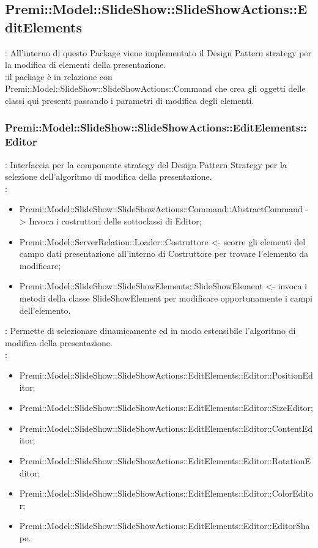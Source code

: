    \subsection{Premi::Model::SlideShow::SlideShowActions::EditElements}{
		\textbf{\tipo}: All’interno di questo Package viene implementato il Design Pattern strategy per la modifica di elementi della presentazione.\\
		\textbf{\relaz}:il package è in relazione con Premi::Model::SlideShow::SlideShowActions::Command che crea gli oggetti delle classi qui presenti passando i parametri di modifica degli elementi.\\
	
	\subsubsection{Premi::Model::SlideShow::SlideShowActions::EditElements::Editor}{
		\textbf{\tipo}: Interfaccia per la componente strategy del Design Pattern Strategy per la selezione dell'algoritmo di modifica della presentazione.\\	
		\textbf{\relaz}:
		\begin{itemize}
			\item Premi::Model::SlideShow::SlideShowActions::Command::AbstractCommand -> Invoca i costruttori delle sottoclassi di Editor; 
            \item Premi::Model::ServerRelation::Loader::Costruttore <- scorre gli elementi del campo dati presentazione all’interno di Costruttore per trovare l’elemento da modificare;
            \item Premi::Model::SlideShow::SlideShowElements::SlideShowElement <- invoca i metodi della classe SlideShowElement per modificare opportunamente i campi dell’elemento.
		\end{itemize} 
		\textbf{\interfacce}: Permette di selezionare dinamicamente ed in modo estensibile l'algoritmo di modifica della presentazione.\\
        \textbf{\figli}: 
        \begin{itemize}
            \item Premi::Model::SlideShow::SlideShowActions::EditElements::Editor::PositionEditor;
            \item Premi::Model::SlideShow::SlideShowActions::EditElements::Editor::SizeEditor;
            \item Premi::Model::SlideShow::SlideShowActions::EditElements::Editor::ContentEditor;
            \item Premi::Model::SlideShow::SlideShowActions::EditElements::Editor::RotationEditor;
            \item Premi::Model::SlideShow::SlideShowActions::EditElements::Editor::ColorEditor;
            \item Premi::Model::SlideShow::SlideShowActions::EditElements::Editor::EditorShape.
        \end{itemize}
	}
}

